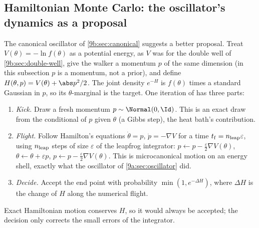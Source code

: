 \subsection{Hamiltonian Monte Carlo: the oscillator's dynamics as a proposal}
\label{9b:sec:hmc}

The canonical oscillator of \cref{9b:sec:canonical} suggests a better proposal. Treat
$V(\theta)=-\ln f(\theta)$ as a potential energy, as $V$ was for the double well of
\cref{9b:sec:double-well}, give the walker a momentum $p$ of the same dimension (in this
subsection $p$ is a momentum, not a prior), and define $H(\theta,p)=V(\theta)+\abs p^2/2$. The
joint density $e^{-H}$ is $f(\theta)$ times a standard Gaussian in $p$, so its $\theta$-marginal is
the target. One iteration of  \parencite{Duane1987,Neal2011} has
three parts:
\begin{enumerate}[itemsep=1pt]
  \item \emph{Kick.} Draw a fresh momentum $p\sim\Normal(0,\Id)$. This is an exact draw from the
        conditional of $p$ given $\theta$ (a Gibbs step), the heat bath's contribution.
  \item \emph{Flight.} Follow Hamilton's equations $\dot\theta=p$, $\dot p=-\nabla V$ for a time
        $t_{\rm f}=n_{\rm leap}\varepsilon$, using $n_{\rm leap}$ steps of size $\varepsilon$ of
        the leapfrog integrator:
        $p\leftarrow p-\tfrac\varepsilon2\nabla V(\theta)$,
        $\theta\leftarrow\theta+\varepsilon p$, $p\leftarrow p-\tfrac\varepsilon2\nabla V(\theta)$.
        This is microcanonical motion on an energy shell, exactly what the oscillator of
        \cref{9a:sec:oscillator} did.
  \item \emph{Decide.} Accept the end point with probability $\min(1,e^{-\Delta H})$, where
        $\Delta H$ is the change of $H$ along the numerical flight.
\end{enumerate}
Exact Hamiltonian motion conserves $H$, so it would always be accepted; the decision only corrects
the small errors of the integrator.

